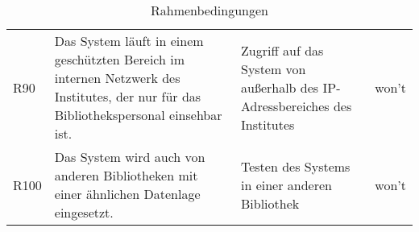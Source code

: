 \begin{table}[h]
\begin{adjustbox}{max width=\textwidth}
\begin{tabular}{lp{6.5cm}p{6.5cm}l}
        R90                              &Das System läuft in einem geschützten Bereich im internen Netzwerk des Institutes, der nur für das Bibliothekspersonal einsehbar ist. & Zugriff auf das System von außerhalb des IP-Adressbereiches des Institutes  & won't\\
        R100                              &Das System wird auch von anderen Bibliotheken mit einer ähnlichen Datenlage eingesetzt. & Testen des Systems in einer anderen Bibliothek & won't\\
       \bottomrule
    \end{tabular}
    \end{adjustbox}
    \caption{%
        Rahmenbedingungen
    }
    \label{tab:Rahmenbedingungen}
    \end{table}
\endgroup









